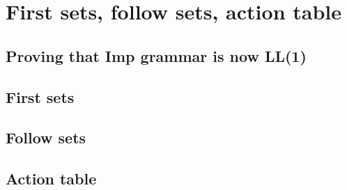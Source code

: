 \chapter{First sets, follow sets, action table}


\section{Proving that Imp grammar is now LL(1)}

\section{First sets}

\section{Follow sets}

\section{Action table}